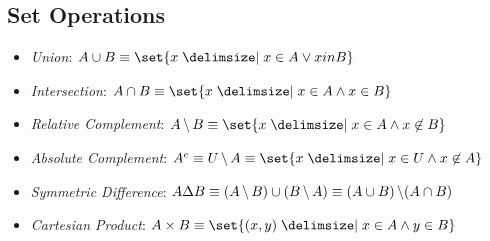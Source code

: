 \subsection{Set Operations}
\begin{itemize}
    \item \textit{Union}: $A \cup B \equiv \set{x \given x \in A \lor x in B}$
    \item \textit{Intersection}: $A \cap B \equiv \set{x \given x \in A \land x \in B}$
    \item \textit{Relative Complement}: $A \Diff B \equiv \set{x \given x \in A \land x \not\in B}$
    \item \textit{Absolute Complement}: $\AbsComplement{A} \equiv U \Diff A \equiv \set{x \given x \in U \land x \not\in A}$
    \item \textit{Symmetric Difference}: $A \Delta B \equiv (A \operatorname{\backslash} B) \cup (B \operatorname{\backslash} A) \equiv (A \cup B)\operatorname{\backslash}(A \cap B)$
    \item \textit{Cartesian Product}: $A \times B \equiv \set{(x, y) \given x \in A \land y \in B}$
\end{itemize}
